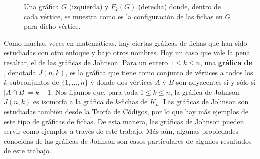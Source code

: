 \begin{figure}[ht!]
    \caption{Una gr\'afica $G$ (izquierda) y $F_2(G)$ (derecha) donde, dentro de
    cada v\'ertice, se muestra como es la configuraci\'on de las fichas en $G$
    para dicho v\'ertice.}
    \label{fig:ex-tok-graph}
\end{figure}

Como muchas veces en matem\'aticas, hay ciertas gr\'aficas de fichas que han
sido estudiadas con otro enfoque y bajo otros nombres. Hay un caso que vale la
pena resaltar, el de las gr\'aficas de Johnson. Para un entero $1 \leq k \leq
n$, una \textbf{gr\'afica de} , denotada $J(n,k)$,
es la gr\'afica que tiene como conjunto de v\'ertices a todos los
$k$-subconjuntos de $\{1, \dots, n\}$ y donde dos v\'ertices $A$ y $B$ son
adyacentes si y s\'olo si $|A \cap B| = k-1$. Nos fijamos que, para toda $1 \leq
k \leq n$, la gr\'afica de Johnson $J(n,k)$ es isomorfa a la gr\'afica de
$k$-fichas de $K_n$. Las gr\'aficas de Johnson son estudiadas tambi\'en desde la
Teor\'ia de C\'odigos, por lo que hay m\'as ejemplos de este tipo de gr\'aficas
de fichas. De esta manera, las gr\'aficas de Johnson pueden servir como ejemplos
a trav\'es de este trabajo. M\'as a\'un, algunas propiedades conocidas de las
gr\'aficas de Johnson son casos particulares de algunos resultados de este
trabajo.

